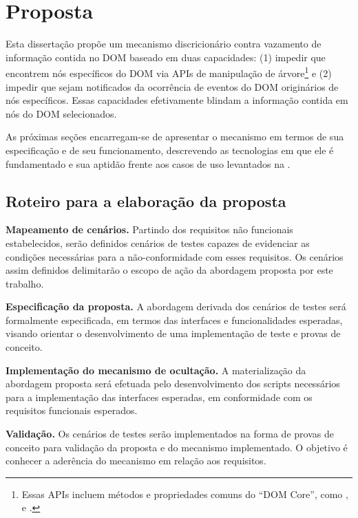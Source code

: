 \chapter{Proposta}

Esta dissertação propõe um mecanismo discricionário contra vazamento de informação contida no DOM baseado em duas capacidades: (1) impedir que {\scripts} encontrem nós específicos do DOM via APIs de manipulação de árvore\footnote{Essas APIs incluem métodos e propriedades comuns do ``DOM Core'', como ,  e .} e (2) impedir que {\scripts} sejam notificados da ocorrência de eventos do DOM originários de nós específicos. Essas capacidades efetivamente blindam a informação contida em nós do DOM selecionados.


As próximas seções encarregam-se de apresentar o mecanismo em termos de sua especificação e de seu funcionamento, descrevendo as tecnologias em que ele é fundamentado e sua aptidão frente aos casos de uso levantados na .





\section{Roteiro para a elaboração da proposta}

\begin{alineas}
	\item \textbf{Mapeamento de cenários.} Partindo dos requisitos não funcionais estabelecidos, serão definidos cenários de testes capazes de evidenciar as condições necessárias para a não-conformidade com esses requisitos. Os cenários assim definidos delimitarão o escopo de ação da abordagem proposta por este trabalho.
	\item \textbf{Especificação da proposta.} A abordagem derivada dos cenários de testes será formalmente especificada, em termos das interfaces e funcionalidades esperadas, visando orientar o desenvolvimento de uma implementação de teste e provas de conceito.
	\item \textbf{Implementação do mecanismo de ocultação.} A materialização da abordagem proposta será efetuada pelo desenvolvimento dos scripts necessários para a implementação das interfaces esperadas, em conformidade com os requisitos funcionais esperados.
	\item \textbf{Validação.} Os cenários de testes serão implementados na forma de provas de conceito para validação da proposta e do mecanismo implementado. O objetivo é conhecer a aderência do mecanismo em relação aos requisitos.
\end{alineas}